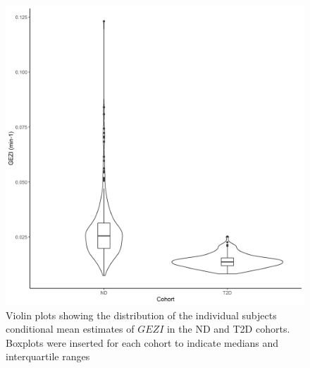 \documentclass[utf8]{frontiersSCNS} %
\begin{document}
\begin{figure}[h!]
\begin{center}
\includegraphics[width=15cm]{fig3.PNG}
\end{center}
\caption{Violin plots showing the distribution of the individual subjects conditional mean estimates of $GEZI$ in the ND and T2D cohorts. Boxplots were inserted for each cohort to indicate medians and interquartile ranges}
\label{fig: SG_co}
\end{figure}
\end{document}
